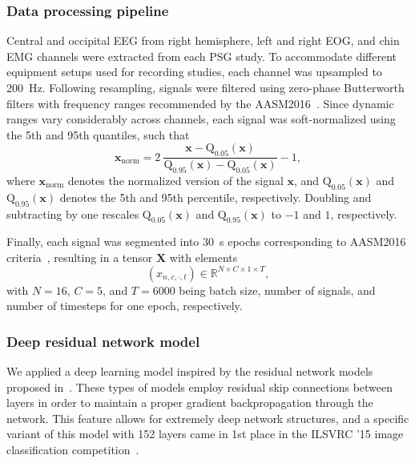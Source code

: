 \subsubsection{Data processing pipeline}
Central and occipital EEG from right hemisphere, left and right EOG, and chin EMG channels were extracted from each PSG study. 
To accommodate different equipment setups used for recording studies, each channel was upsampled to \SI{200}{\hertz}. %
Following resampling, signals were filtered using zero-phase Butterworth filters with frequency ranges recommended by the AASM2016~\cite{Berry2016}. %
Since dynamic ranges vary considerably across channels, each signal was soft-normalized using the 5th and 95th quantiles, such that 
\begin{equation}
    \mathbf{x}_{\mathrm{norm}} = 2~\frac{\mathbf{x} - \mathrm{Q}_{0.05}(\mathbf{x})}{\mathrm{Q}_{0.95}(\mathbf{x}) - \mathrm{Q}_{0.05}(\mathbf{x})} - 1,
\end{equation}
where $\mathbf{x}_{\mathrm{norm}}$ denotes the normalized version of the signal $\mathbf{x}$, and $\mathrm{Q}_{0.05}(\mathbf{x})$ and $\mathrm{Q}_{0.95}(\mathbf{x})$ denotes the 5th and 95th percentile, respectively.
Doubling and subtracting by one rescales $\mathrm{Q}_{0.05}(\mathbf{x})$ and $\mathrm{Q}_{0.95}(\mathbf{x})$ to $-1$ and $1$, respectively.

Finally, each signal was segmented into \SI{30}{\second} epochs corresponding to AASM2016 criteria~\cite{Berry2016}, resulting in a tensor $\mathbf{X}$ with elements 
\begin{equation}
    (x_{n,c,\cdot,t}) \in \mathbb{R}^{N\times C\times 1 \times T},
\end{equation}
with $N=16$, $C=5$, and $T=6000$ being batch size, number of signals, and number of timesteps for one epoch, respectively. %

\subsubsection{Deep residual network model}
We applied a deep learning model inspired by the residual network models proposed in~\cite{He2016,He2016b}.
These types of models employ residual skip connections between layers in order to maintain a proper gradient backpropagation through the network.
This feature allows for extremely deep network structures, and a specific variant of this model with 152 layers came in 1st place in the ILSVRC '15 image classification competition~\cite{He2016}.

